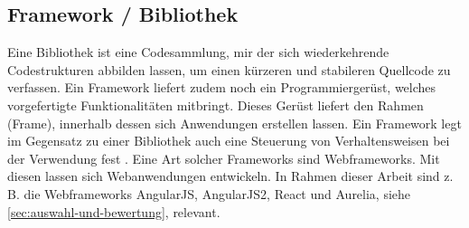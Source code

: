 \subsection{Framework / Bibliothek}
Eine Bibliothek ist eine Codesammlung, mir der sich wiederkehrende Codestrukturen abbilden lassen, um einen kürzeren und stabileren Quellcode zu verfassen. Ein Framework liefert zudem noch ein  Programmiergerüst, welches vorgefertigte Funktionalitäten mitbringt. Dieses Gerüst liefert den Rahmen (Frame), innerhalb dessen sich Anwendungen erstellen lassen. Ein Framework legt im Gegensatz zu einer Bibliothek auch eine Steuerung von Verhaltensweisen bei der Verwendung fest \cite[S. 20]{steyer2011jquery}.  Eine Art solcher Frameworks sind Webframeworks. Mit diesen lassen sich Webanwendungen entwickeln. In Rahmen dieser Arbeit sind z. B. die Webframeworks AngularJS, AngularJS2, React und Aurelia, siehe \autoref{sec:auswahl-und-bewertung}, relevant.